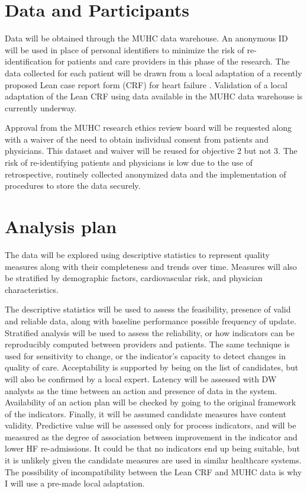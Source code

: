 \section{Data and Participants}
Data will be obtained through the MUHC data warehouse. An anonymous ID will be used in place of personal identifiers to minimize the risk of re-identification for patients and care providers in this phase of the research. The data collected for each patient will be drawn from a local adaptation of a recently proposed Lean case report form (\gls{CRF}) for heart failure \cite{psotka2019design}. Validation of a local adaptation of the Lean CRF using data available in the MUHC data warehouse is currently underway. 

Approval from the MUHC research ethics review board will be requested along with a waiver of the need to obtain individual consent from patients and physicians. This dataset and waiver will be reused for objective 2 but not 3. The risk of re-identifying patients and physicians is low due to the use of retrospective, routinely collected anonymized data and the implementation of procedures to store the data securely.

\section{Analysis plan}
The data will be explored using descriptive statistics to represent quality measures along with their completeness and trends over time. Measures will also be stratified by demographic factors, cardiovascular risk, and physician characteristics.

The descriptive statistics will be used to assess the feasibility, presence of valid and reliable data, along with baseline performance possible frequency of update. Stratified analysis will be used to assess the reliability, or how indicators can be reproducibly computed between providers and patients. The same technique is used for sensitivity to change, or the indicator's capacity to detect changes in quality of care. Acceptability is supported by being on the list of candidates, but will also be confirmed by a local expert. Latency will be assessed with DW analysts as the time between an action and presence of data in the system. Availability of an action plan will be checked by going to the original framework of the indicators. Finally, it will be assumed candidate measures have content validity. Predictive value will be assessed only for process indicators, and will be measured as the degree of association between improvement in the indicator and lower HF re-admissions.
It could be that no indicators end up being suitable, but it is unlikely given the candidate measures are used in similar healthcare systems. The possibility of incompatibility between the Lean CRF and MUHC data is why I will use a pre-made local adaptation.

